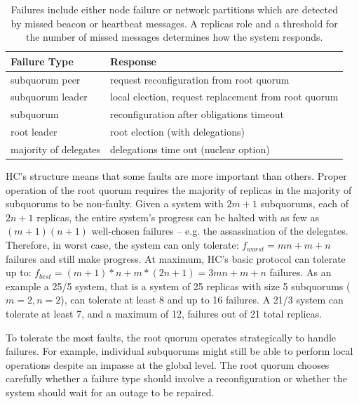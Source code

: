 \renewcommand{\baselinestretch}{1}
\small\normalsize
 \begin{table}[t!]
\caption[HC Failure Categories]{Failures include either node failure or network partitions which are detected by missed beacon or heartbeat messages. A replicas role and a threshold for the number of missed messages determines how the system responds.}
\begin{center}
\begin{tabular}{l|l}
\hline
Failure Type & Response \\
\hline \hline
subquorum peer & request reconfiguration from root quorum \\
subquorum leader & local election, request replacement from root quorum \\
subquorum & reconfiguration after obligations timeout \\
root leader & root election (with delegations)\\
majority of delegates & delegations time out (nuclear option) \\
\hline
\end{tabular}
\end{center}
\label{tab:failure_categories}
\end{table}
 \renewcommand{\baselinestretch}{2}
\small\normalsize

HC's structure means that some faults are more important than others.
Proper operation of the root quorum requires the majority of replicas in the majority of subquorums to be non-faulty.
Given a system with $2m+1$ subquorums, each of $2n+1$ replicas, the entire system's progress can be halted with as few as $(m+1)(n+1)$ well-chosen failures -- e.g. the assassination of the delegates.
Therefore, in worst case, the system can only tolerate: $f_{worst}=mn+m+n$ failures and still make progress.
At maximum, HC's basic protocol can tolerate up to: $f_{best} = (m+1)*n + m*(2n+1) = 3mn+m+n$ failures.
As an example a 25/5 system, that is a system of 25 replicas with size 5 subquorums ($m=2, n=2$), can tolerate at least 8 and up to 16 failures.
A 21/3 system can tolerate at least 7, and a maximum of 12, failures out of 21 total replicas.

To tolerate the most faults, the root quorum operates strategically to handle failures.
For example, individual subquorums might still be able to perform local operations despite an impasse at the global level.
The root quorum chooses carefully whether a failure type should involve a reconfiguration or whether the system should wait for an outage to be repaired.

